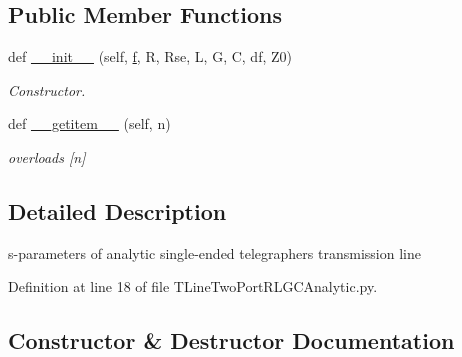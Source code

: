 \subsection*{Public Member Functions}
\begin{DoxyCompactItemize}
\item 
def \hyperlink{classSignalIntegrity_1_1SParameters_1_1Devices_1_1TLineTwoPortRLGCAnalytic_1_1TLineTwoPortRLGCAnalytic_a7bb4433ce4f16bca3d1fba761e3a1f9c}{\+\_\+\+\_\+init\+\_\+\+\_\+} (self, \hyperlink{classSignalIntegrity_1_1SParameters_1_1SParameters_1_1SParameters_a32e7a34d6837fe949b413c852a0447f8}{f}, R, Rse, L, G, C, df, Z0)
\begin{DoxyCompactList}\small\item\em Constructor. \end{DoxyCompactList}\item 
def \hyperlink{classSignalIntegrity_1_1SParameters_1_1Devices_1_1TLineTwoPortRLGCAnalytic_1_1TLineTwoPortRLGCAnalytic_ab7a6da5139e0878b590d68292aaa70f2}{\+\_\+\+\_\+getitem\+\_\+\+\_\+} (self, n)
\begin{DoxyCompactList}\small\item\em overloads \mbox{[}n\mbox{]} \end{DoxyCompactList}\end{DoxyCompactItemize}


\subsection{Detailed Description}
s-\/parameters of analytic single-\/ended telegraphers transmission line 

Definition at line 18 of file T\+Line\+Two\+Port\+R\+L\+G\+C\+Analytic.\+py.



\subsection{Constructor \& Destructor Documentation}
\mbox{\label{classSignalIntegrity_1_1SParameters_1_1Devices_1_1TLineTwoPortRLGCAnalytic_1_1TLineTwoPortRLGCAnalytic_a7bb4433ce4f16bca3d1fba761e3a1f9c}} 
